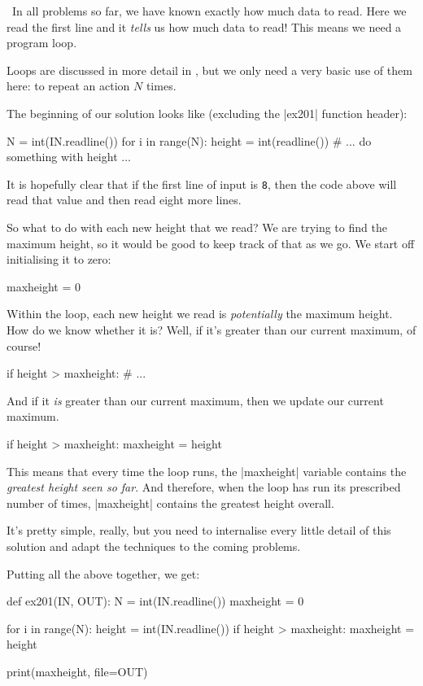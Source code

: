 \Scratch\ In all problems so far, we have known exactly how much data to read. Here we
read the first line and it \emph{tells} us how much data to read! This means we need a
program loop.

Loops are discussed in more detail in , but we only need a very
basic use of them here: to repeat an action $N$ times.

The beginning of our solution looks like (excluding the \pycode|ex201| function header):
\begin{pythoncode}
  N = int(IN.readline())
  for i in range(N):
    height = int(readline())
    # ... do something with height ...
\end{pythoncode}

It is hopefully clear that if the first line of input is \texttt{8}, then the code above
will read that value and then read eight more lines.

So what to do with each new height that we read? We are trying to find the maximum height,
so it would be good to keep track of that as we go. We start off initialising it to zero:
\begin{pythoncode}
  maxheight = 0
\end{pythoncode}

Within the loop, each new height we read is \emph{potentially} the maximum height. How do
we know whether it is? Well, if it's greater than our current maximum, of course!
\begin{pythoncode}
  if height > maxheight:
    # ...
\end{pythoncode}

And if it \emph{is} greater than our current maximum, then we update our current maximum.
\begin{pythoncode}
  if height > maxheight:
    maxheight = height
\end{pythoncode}

This means that every time the loop runs, the \pycode|maxheight| variable contains the
\emph{greatest height seen so far}. And therefore, when the loop has run its prescribed
number of times, \pycode|maxheight| contains the greatest height overall.

It's pretty simple, really, but you need to internalise every little detail of this
solution and adapt the techniques to the coming problems.

\Solution

Putting all the above together, we get:

\begin{pythoncode} 
  def ex201(IN, OUT):
    N = int(IN.readline())
    maxheight = 0

    for i in range(N):
      height = int(IN.readline())
      if height > maxheight:
        maxheight = height

    print(maxheight, file=OUT)
\end{pythoncode}

